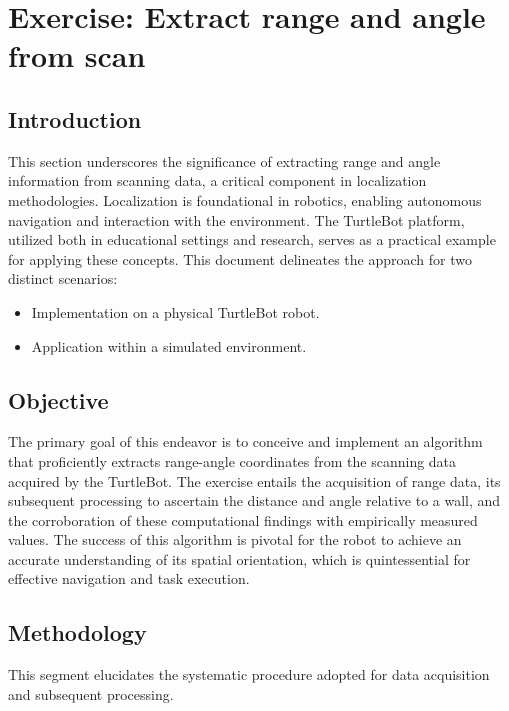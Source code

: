 \documentclass[12pt,a4paper]{article}
\begin{document}
	
	\clearpage
	\section{Exercise: Extract range and angle from scan}
	\subsection{Introduction}
	This section underscores the significance of extracting range and angle information from scanning data, a critical component in localization methodologies. Localization is foundational in robotics, enabling autonomous navigation and interaction with the environment. The TurtleBot platform, utilized both in educational settings and research, serves as a practical example for applying these concepts. This document delineates the approach for two distinct scenarios:
	\begin{itemize}
		\item Implementation on a physical TurtleBot robot.
		\item Application within a simulated environment.
	\end{itemize}
	
	\subsection{Objective}
	The primary goal of this endeavor is to conceive and implement an algorithm that proficiently extracts range-angle coordinates from the scanning data acquired by the TurtleBot. The exercise entails the acquisition of range data, its subsequent processing to ascertain the distance and angle relative to a wall, and the corroboration of these computational findings with empirically measured values. The success of this algorithm is pivotal for the robot to achieve an accurate understanding of its spatial orientation, which is quintessential for effective navigation and task execution.
	
	
	\subsection{Methodology}
	This segment elucidates the systematic procedure adopted for data acquisition and subsequent processing.
	
\end{document}
